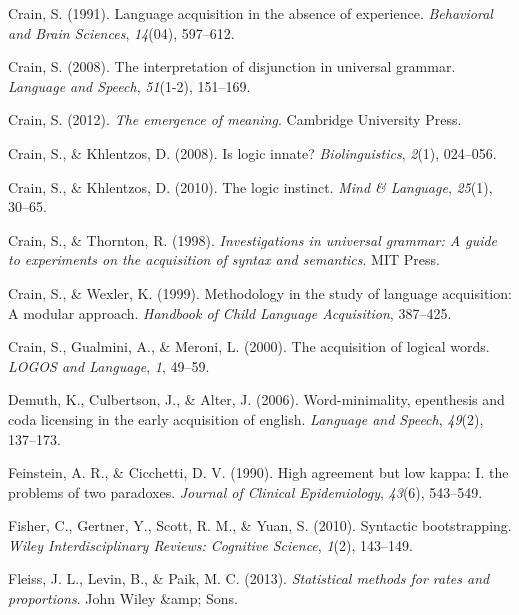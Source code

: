 \documentclass[oneside]{report}
\theoremstyle{definition}
\theoremstyle{definition}
\theoremstyle{definition}
\theoremstyle{remark}
\begin{document}
\hypertarget{ref-crain1991language}{}
Crain, S. (1991). Language acquisition in the absence of experience.
\emph{Behavioral and Brain Sciences}, \emph{14}(04), 597--612.

\hypertarget{ref-crain2008interpretation}{}
Crain, S. (2008). The interpretation of disjunction in universal
grammar. \emph{Language and Speech}, \emph{51}(1-2), 151--169.

\hypertarget{ref-crain2012emergence}{}
Crain, S. (2012). \emph{The emergence of meaning}. Cambridge University
Press.

\hypertarget{ref-crain2008logic}{}
Crain, S., \& Khlentzos, D. (2008). Is logic innate?
\emph{Biolinguistics}, \emph{2}(1), 024--056.

\hypertarget{ref-crain2010logic}{}
Crain, S., \& Khlentzos, D. (2010). The logic instinct. \emph{Mind \&
Language}, \emph{25}(1), 30--65.

\hypertarget{ref-crain1998investigations}{}
Crain, S., \& Thornton, R. (1998). \emph{Investigations in universal
grammar: A guide to experiments on the acquisition of syntax and
semantics}. MIT Press.

\hypertarget{ref-crain1999methodology}{}
Crain, S., \& Wexler, K. (1999). Methodology in the study of language
acquisition: A modular approach. \emph{Handbook of Child Language
Acquisition}, 387--425.

\hypertarget{ref-crain2000acquisition}{}
Crain, S., Gualmini, A., \& Meroni, L. (2000). The acquisition of
logical words. \emph{LOGOS and Language}, \emph{1}, 49--59.

\hypertarget{ref-demuth2006word}{}
Demuth, K., Culbertson, J., \& Alter, J. (2006). Word-minimality,
epenthesis and coda licensing in the early acquisition of english.
\emph{Language and Speech}, \emph{49}(2), 137--173.

\hypertarget{ref-feinstein1990high}{}
Feinstein, A. R., \& Cicchetti, D. V. (1990). High agreement but low
kappa: I. the problems of two paradoxes. \emph{Journal of Clinical
Epidemiology}, \emph{43}(6), 543--549.

\hypertarget{ref-fisher2010syntactic}{}
Fisher, C., Gertner, Y., Scott, R. M., \& Yuan, S. (2010). Syntactic
bootstrapping. \emph{Wiley Interdisciplinary Reviews: Cognitive
Science}, \emph{1}(2), 143--149.

\hypertarget{ref-fleiss2013statistical}{}
Fleiss, J. L., Levin, B., \& Paik, M. C. (2013). \emph{Statistical
methods for rates and proportions}. John Wiley \&amp; Sons.
\end{document}
